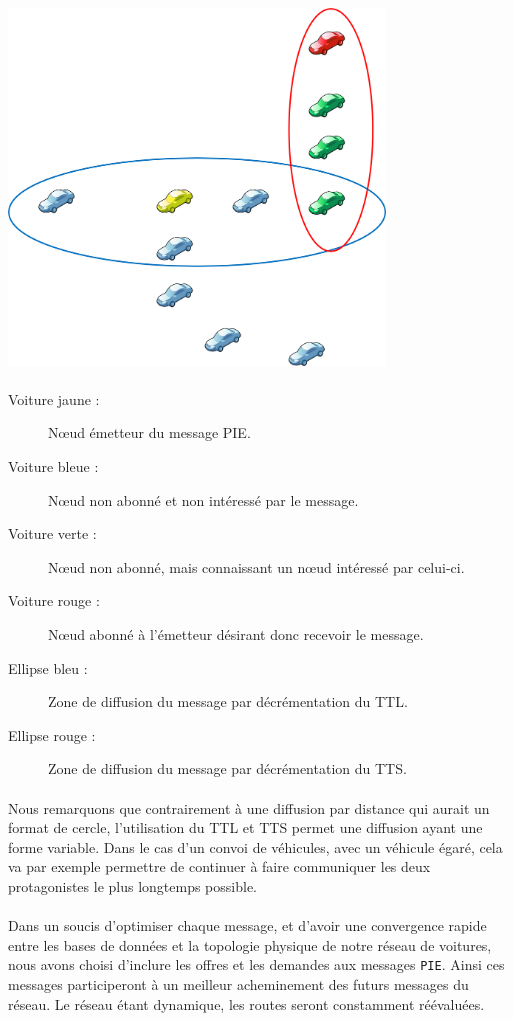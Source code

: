 \begin{center}
	\includegraphics[width=0.75\textwidth]{img/schema2}
\end{center}

\paragraph*{}
\begin{description}
	\item[Voiture jaune :] N\oe ud émetteur du message PIE.
	\item[Voiture bleue :] N\oe ud non abonné et non intéressé par le message.
	\item[Voiture verte :] N\oe ud non abonné, mais connaissant un n\oe ud intéressé par celui-ci.
	\item[Voiture rouge :] N\oe ud abonné à l'émetteur désirant donc recevoir le message.
	\item[Ellipse bleu :] Zone de diffusion du message par décrémentation du TTL.
	\item[Ellipse rouge :] Zone de diffusion du message par décrémentation du TTS.
\end{description}
\paragraph*{}
Nous remarquons que contrairement à une diffusion par distance qui aurait un format de cercle, l'utilisation du TTL et TTS permet une diffusion ayant une forme variable. Dans le cas d'un convoi de véhicules, avec un véhicule égaré, cela va par exemple permettre de continuer à faire communiquer les deux protagonistes le plus longtemps possible.


\paragraph*{}
Dans un soucis d'optimiser chaque message, et d'avoir une convergence rapide entre les bases de données et la topologie physique de notre réseau de voitures, nous avons choisi d'inclure les offres et les demandes aux messages \texttt{PIE}. Ainsi ces messages participeront à un meilleur acheminement des futurs messages du réseau. Le réseau étant dynamique, les routes seront constamment réévaluées.
